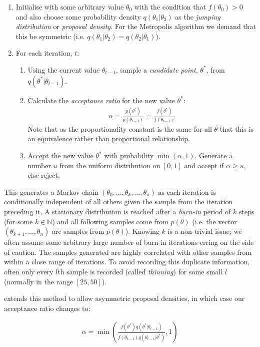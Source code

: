 \documentclass[11pt]{article} %
\begin{document}
\begin{enumerate}
 \item Initialise with some arbitrary value $\theta_0$ with the condition that $f(\theta_0) > 0$ and also choose some probability density $q(\theta_1|\theta_2)$ as the \emph{jumping distribution} or \emph{proposal density}. For the Metropolis algorithm we demand that this be symmetric (i.e. $q(\theta_1 | \theta_2) = q(\theta_2 | \theta_1)$).
 \item For each iteration, $t$:
 \begin{enumerate}
   \item Using the current value $\theta_{t-1}$, sample a \emph{candidate point}, $\theta^*$, from  $q(\theta^* | \theta_{t-1})$.
   \item Calculate the \emph{acceptance ratio} for the new value $\theta^*$:
    \begin{align}
    \alpha = \frac{p(\theta^*)}{p(\theta_{t-1})} = \frac{f(\theta^*)}{f(\theta_{t-1})}
    \end{align}
    Note that as the proportionality constant is the same for all $\theta$ that this is an equivalence rather than proportional relationship.
    \item Accept the new value $\theta^*$ with probability $\min(\alpha, 1)$. Generate a number $u$ from the uniform distribution on $[0,1]$ and accept if $\alpha \geq u$, else reject.
  \end{enumerate}
\end{enumerate}
This generates a Markov chain $(\theta_0,\ldots,\theta_k,\ldots, \theta_n)$ as each iteration is conditionally independent of all others given the sample from the iteration preceding it. A stationary distribution is reached after a \emph{burn-in} period of $k$ steps (for some $k \in \mathbb{N}$) and all following samples come from $p(\theta)$ (i.e. the vector $(\theta_{k+1},\ldots,\theta_n)$ are samples from $p(\theta)$). Knowing $k$ is a non-trivial issue; we often assume some arbitrary large number of burn-in iterations erring on the side of caution. The samples generated are highly correlated with other samples from within a close range of iterations. To avoid recording this duplicate information, often only every $l$th sample is recorded (called \emph{thinning}) for some small $l$ (normally in the range $[25, 50]$).

\citet{HastingsMonteCarloSampling} extends this method to allow asymmetric proposal densities, in which case our acceptance ratio changes to:

\begin{align} \label{metropolis_hastings_alpha}
\alpha = \min\left(\frac{f(\theta^*) q(\theta^*|\theta_{t-1})}{f(\theta_{t-1})q(\theta_{t-1}|\theta^*)}, 1\right)
\end{align}
\end{document}
